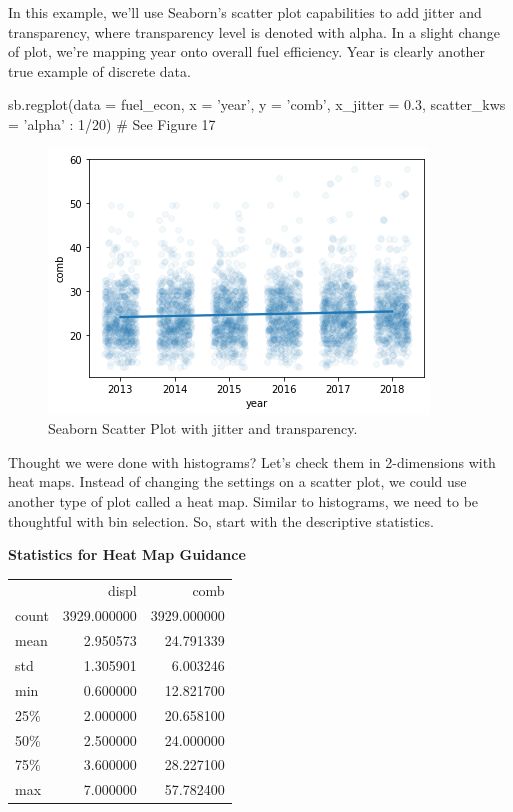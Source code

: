 In this example, we'll use Seaborn's scatter plot capabilities to add jitter and transparency, where transparency level is denoted with alpha. In a slight change of plot, we're mapping year onto overall fuel efficiency. Year is clearly another true example of discrete data.

\begin{python}
	sb.regplot(data = fuel_econ, x = 'year', y = 'comb', x_jitter = 0.3, scatter_kws = {'alpha' : 1/20})
	# See Figure 17
\end{python}

\begin{figure}
	\includegraphics{images/figure17.png}
	\caption{Seaborn Scatter Plot with jitter and transparency.}\label{fig:figure17}
\end{figure}

\newpage
Thought we were done with histograms? Let's check them in 2-dimensions with heat maps. Instead of changing the settings on a scatter plot, we could use another type of plot called a heat map. Similar to histograms, we need to be thoughtful with bin selection. So, start with the descriptive statistics.

\textbf{Statistics for Heat Map Guidance}
\begin{center}
	\begin{tabular}{lrr}
		{} &        displ &         comb \\
		count &  3929.000000 &  3929.000000 \\
		mean  &     2.950573 &    24.791339 \\
		std   &     1.305901 &     6.003246 \\
		min   &     0.600000 &    12.821700 \\
		25\%   &     2.000000 &    20.658100 \\
		50\%   &     2.500000 &    24.000000 \\
		75\%   &     3.600000 &    28.227100 \\
		max   &     7.000000 &    57.782400 \\
	\end{tabular}
\end{center}


